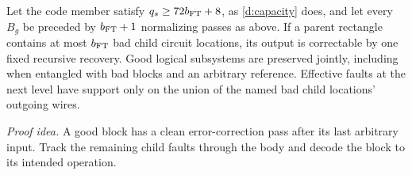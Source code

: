 \begin{lemma}\label{d:reduction}
Let the code member satisfy \(q_s\ge72b_{\rm FT}+8\), as \eqref{d:capacity} does,
and let every \(B_g\) be preceded by \(b_{\rm FT}+1\) normalizing passes as above.
If a parent rectangle contains at most \(b_{\rm FT}\) bad child
circuit locations, its output is correctable by one fixed recursive
recovery. Good logical subsystems are preserved jointly, including
when entangled with bad blocks and an arbitrary reference. Effective
faults at the next level have support only on the union of the named
bad child locations' outgoing wires.
\end{lemma}
\par\noindent\emph{Proof idea.} A good block has a clean error-correction pass after its last arbitrary input. Track the remaining child faults through the body and decode the block to its intended operation.

